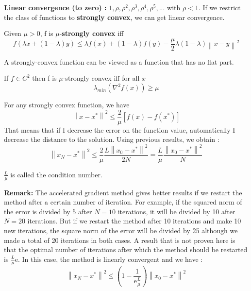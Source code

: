 \textbf{Linear convergence (to zero) :} $1, \rho, \rho ^2, \rho ^3, \rho ^4, \rho ^5, ... $ with $\rho < 1$. If we restrict the class of functions to \textbf{strongly convex}, we can get linear convergence.\\

\begin{definition}
Given $\mu>0$, f is $\mu$-\textbf{strongly convex} iff
\begin{equation*}
f(\lambda x + (1-\lambda)y)\leq \lambda f(x) + (1-\lambda)f(y) - \frac{\mu}{2}\lambda (1-\lambda)\left\|x - y\right\|^2
\end{equation*}
\end{definition}

A strongly-convex function can be viewed as a function that has no flat part.

\begin{proposition}
If $f \in C^2$ then f is $\mu$-strongly convex iff for all $x$ 
\[
    \lambda_{min}(\nabla^2f(x))\ge \mu
\]
\end{proposition}


\begin{lemma}
For any strongly convex function, we have
\begin{equation*}
\left\|x - x^*\right\|^2 \leq \frac{2}{\mu}[f(x) - f(x^*)]
\end{equation*}
That means that if I decrease the error on the function value, automatically I decrease the distance to the solution. Using previous results, we obtain :
\begin{equation*}
\left\|x_N - x^*\right\|^2 \leq \frac{2}{\mu}\frac{L\left\|x_0 - x^*\right\|^2}{2N} = \frac{L}{\mu}\frac{\left\|x_0 - x^*\right\|^2}{N}
\end{equation*}
\end{lemma}

$\frac{L}{\mu}$ is called the condition number.


\textbf{Remark:} The accelerated gradient method gives better results if we restart the method after a certain number of iteration. For example, if the squared norm of the error is divided by 5 after $N = 10$ iterations, it will be divided by 10 after $N = 20$ iterations. But if we restart the method after 10 iterations and make 10 new iterations, the square norm of the error will be divided by 25 although we made a total of 20 iterations in both cases. A result that is not proven here is that the optimal number of iterations after which the method should be restarted is $\frac{L}{\mu}\text{e}$. In this case, the method is linearly convergent and we have :
\[
    \left\|x_N - x^*\right\|^2 \leq \left(1-\frac{1}{\text{e}\frac{L}{\mu}}\right)\left\|x_0 - x^*\right\|^2
\]

%
